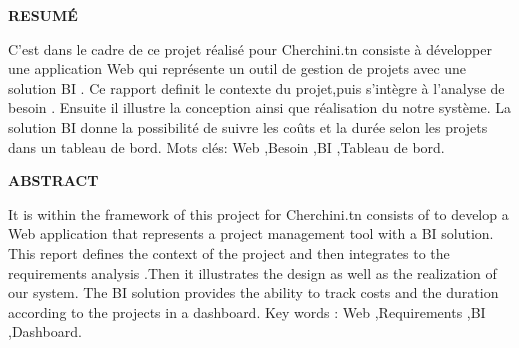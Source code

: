 \newpage
\bigskip

\textbf{RESUM\'E}

\bigskip


C'est dans le cadre de ce projet  r\'{e}alis\'{e} pour Cherchini.tn consiste \`{a} d\'{e}velopper une application Web qui repr\'{e}sente un
outil de gestion de projets avec une solution BI .
Ce rapport definit le contexte du projet,puis s'int\`{e}gre \`{a} l'analyse de besoin
. Ensuite il illustre la conception ainsi que r\'{e}alisation du notre syst\`{e}me.
La solution BI donne la possibilité de suivre les coûts et la durée selon les  projets dans un tableau de bord.
\newline
\bigskip
Mots cl\'{e}s: Web ,Besoin ,BI ,Tableau de bord.



\bigskip
\bigskip
\bigskip

\textbf{ABSTRACT}


\bigskip


It is within the framework of this project for Cherchini.tn consists of
to develop a Web application that represents a project management tool
with a BI solution. This report defines the context of the project and then integrates
to the requirements analysis .Then it illustrates the design as well as the realization
of our system. The BI solution provides the ability to track costs and
the duration according to the projects in a dashboard.
\newline
\bigskip
Key words : Web ,Requirements ,BI ,Dashboard. 
